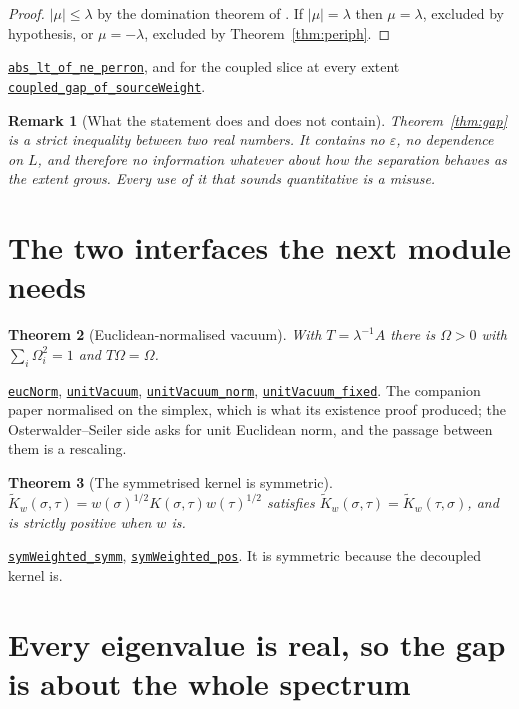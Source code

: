 \documentclass[11pt]{article}
\newtheorem{theorem}{Theorem}[section]
\newtheorem{remark}[theorem]{Remark}
\theoremstyle{definition}
\newcommand{\anchor}{ac8979631c1541b059b3c10f590ca174b0b5f6be}
\newcommand{\osline}[3]{%
  \href{https://github.com/lluiseriksson/THE-ERIKSSON-PROGRAMME/blob/\anchor/YangMills/OS/#1.lean\#L#2}{\nolinkurl{#3}}}
\newcommand{\Om}{\Omega}
\begin{document}
\begin{proof}
$|\mu|\le\lambda$ by the domination theorem of \cite{ErikssonBirkhoff}.  If
$|\mu|=\lambda$ then $\mu=\lambda$, excluded by hypothesis, or $\mu=-\lambda$,
excluded by Theorem~\ref{thm:periph}.
\end{proof}

\osline{PerronGap}{246}{abs\_lt\_of\_ne\_perron}, and for the coupled slice
at every extent \osline{PerronGap}{414}{coupled\_gap\_of\_sourceWeight}.

\begin{remark}[What the statement does and does not contain]
Theorem~\ref{thm:gap} is a strict inequality between two real numbers.  It
contains no $\varepsilon$, no dependence on $L$, and therefore no information
whatever about how the separation behaves as the extent grows.  Every use of it
that sounds quantitative is a misuse.
\end{remark}

\section{The two interfaces the next module needs}

\begin{theorem}[Euclidean-normalised vacuum]\label{thm:unit}
With $T=\lambda^{-1}A$ there is $\Om>0$ with $\sum_i\Om_i^2=1$ and $T\Om=\Om$.
\end{theorem}

\osline{PerronGap}{270}{eucNorm},
\osline{PerronGap}{279}{unitVacuum},
\osline{PerronGap}{286}{unitVacuum\_norm},
\osline{PerronGap}{303}{unitVacuum\_fixed}.  The companion paper normalised
on the simplex, which is what its existence proof produced; the
Osterwalder--Seiler side asks for unit Euclidean norm, and the passage between
them is a rescaling.

\begin{theorem}[The symmetrised kernel is symmetric]\label{thm:sym}
$\widetilde K_w(\sigma,\tau)=w(\sigma)^{1/2}K(\sigma,\tau)w(\tau)^{1/2}$
satisfies $\widetilde K_w(\sigma,\tau)=\widetilde K_w(\tau,\sigma)$, and is
strictly positive when $w$ is.
\end{theorem}

\osline{PerronGap}{328}{symWeighted\_symm},
\osline{PerronGap}{335}{symWeighted\_pos}.  It is symmetric because the
decoupled kernel is.

\section{Every eigenvalue is real, so the gap is about the whole spectrum}
\label{sec:real}
\end{document}

